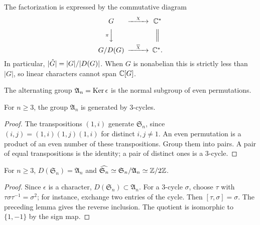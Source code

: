 
\begin{rem}
The factorization is expressed by the commutative diagram
\[
 \begin{CD}
 G @>{\chi}>> \CC^*\\
 @V{\pi}VV @|\\
 G/D(G) @>{\ol\chi}>> \CC^*.
 \end{CD}
\]
In particular, $|\hat{G}|=|G|/|D(G)|$. When $G$ is nonabelian this is strictly
less than $|G|$, so linear characters cannot span $\mathbb{C}[G]$.
\end{rem}

\label{notation-20}
The alternating group $\mathfrak A_n=\operatorname{Ker}\epsilon$ is the normal subgroup of
even permutations.


\begin{lem}
For $n\geq3$, the group $\mathfrak A_n$ is generated by $3$-cycles.
\end{lem}
\begin{proof}
The transpositions $(1,i)$ generate $\mathfrak S_n$, since
$(i,j)=(1,i)(1,j)(1,i)$ for distinct $i,j\neq1$. An even permutation is a
product of an even number of these transpositions. Group them into pairs.
A pair of equal transpositions is the identity; a pair of distinct ones is a
$3$-cycle.
\end{proof}


\begin{prop}
For $n\geq3$, $D(\mathfrak S_n)=\mathfrak A_n$ and
$\widehat{\mathfrak S_n}\simeq\mathfrak S_n/\mathfrak A_n\simeq\mathbb{Z}/2\mathbb{Z}$.
\end{prop}
\begin{proof}
Since $\epsilon$ is a character, $D(\mathfrak S_n)\subset\mathfrak A_n$.
For a $3$-cycle $\sigma$, choose $\tau$ with
$\tau\sigma\tau^{-1}=\sigma^2$; for instance, exchange two entries of the
cycle. Then $[\tau,\sigma]=\sigma$. The preceding lemma gives the reverse
inclusion. The quotient is isomorphic to $\{1,-1\}$ by the sign map.
\end{proof}

